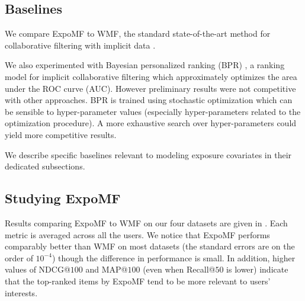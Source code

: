 \subsection{Baselines}

We compare ExpoMF to \gls{WMF}, the standard
state-of-the-art method for collaborative filtering with implicit data
\citep{hu2008collaborative}. 

We also experimented with Bayesian personalized ranking (BPR)
\citep{rendle2009bpr}, a ranking model for implicit collaborative filtering which approximately optimizes the area under the ROC curve (AUC). However preliminary results were not competitive with other
approaches. BPR is trained using stochastic optimization which can be
sensible to hyper-parameter values (especially hyper-parameters related to
the optimization procedure). A more exhaustive search over hyper-parameters
could yield more competitive results. 

We describe specific baselines relevant to modeling exposure covariates
in their dedicated subsections.

\subsection{Studying ExpoMF} 
\label{chpt:expomf:sec:expomf_study}

 Results comparing ExpoMF to \gls{WMF} on our four
datasets are given in
. Each metric is averaged across all the users.
We notice that ExpoMF performs comparably better than \gls{WMF} on most
datasets (the standard errors are on the order of $10^{-4}$) %
though the difference in performance is small. In addition, higher values
of NDCG@$100$ and MAP@$100$ (even when Recall@$50$ is lower) indicate that the
top-ranked items by ExpoMF tend to be more relevant to users' interests.  


